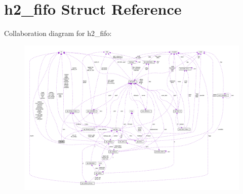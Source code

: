 \hypertarget{structh2__fifo}{}\section{h2\+\_\+fifo Struct Reference}
\label{structh2__fifo}


Collaboration diagram for h2\+\_\+fifo\+:
\nopagebreak
\begin{figure}[H]
\begin{center}
\leavevmode
\includegraphics[width=350pt]{structh2__fifo__coll__graph}
\end{center}
\end{figure}
